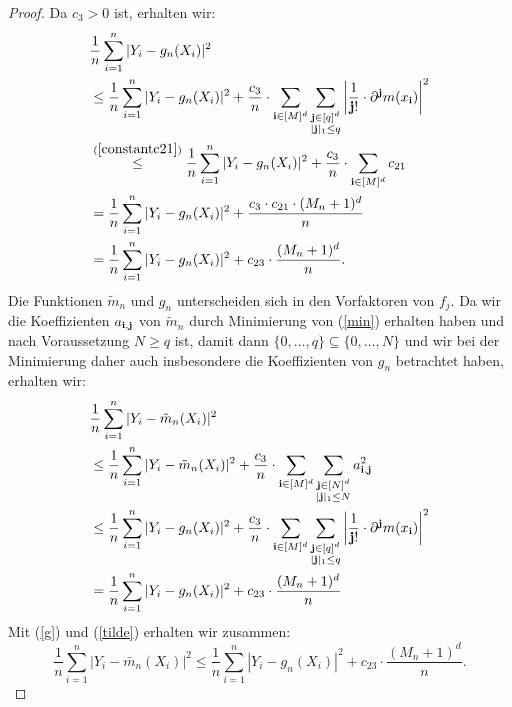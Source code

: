 \begin{proof}
Da $c_3 > 0$ ist, erhalten wir:
\begin{equation}
\begin{split}
\label{g}
& \frac{1}{n} \sum_{i = 1}^n|Y_i - g_n(X_i)|^2 \\
& \leq \frac{1}{n} \sum_{i = 1}^n|Y_i - g_n(X_i)|^2 + \frac{c_3}{n} \cdot \sum_{\mathbf{i} \in [M]^d} \sum_{\substack{\mathbf{j} \in [q]^d \\ |\mathbf{j}|_1 \leq q}} \bigg|\frac{1}{\mathbf{j}!} \cdot \partial^{\mathbf{j}}m(x_{\mathbf{i}})\bigg|^2 \\
& \stackrel{(\ref{constantc21})}{\leq} \frac{1}{n} \sum_{i = 1}^n|Y_i - g_n(X_i)|^2 +  \frac{c_3}{n} \cdot \sum_{\mathbf{i} \in [M]^d} c_{21} \\
& = \frac{1}{n} \sum_{i = 1}^n|Y_i - g_n(X_i)|^2 + \frac{c_3 \cdot c_{21} \cdot (M_n + 1)^d}{n} \\
& = \frac{1}{n} \sum_{i = 1}^n|Y_i - g_n(X_i)|^2 + c_{23} \cdot \frac{(M_n + 1)^d}{n}.
\end{split}
\end{equation}
Die Funktionen $\tilde{m}_n$ und $g_n$ unterscheiden sich in den Vorfaktoren von $f_j$. Da wir die Koeffizienten $a_{\mathbf{i},\mathbf{j}}$ von $\tilde{m}_n$ durch Minimierung von (\ref{min}) erhalten haben und nach Voraussetzung $N \geq q$ ist, damit dann $\{0,\dots,q\} \subseteq \{0,\dots,N\}$ und wir bei der Minimierung daher auch insbesondere die Koeffizienten von $g_n$ betrachtet haben, erhalten wir:
\begin{equation}
\begin{split}
\label{tilde}
& \frac{1}{n} \sum_{i = 1}^n|Y_i - \tilde{m}_n(X_i)|^2 \\
& \leq \frac{1}{n} \sum_{i = 1}^n|Y_i - \tilde{m}_n(X_i)|^2 + \frac{c_3}{n} \cdot \sum_{\mathbf{i} \in [M]^d} \sum_{\substack{ \mathbf{j} \in [N]^d \\ |\mathbf{j}|_1 \leq N}} a_{\mathbf{i},\mathbf{j}}^2 \\
& \leq \frac{1}{n} \sum_{i = 1}^n|Y_i - g_n(X_i)|^2 + \frac{c_3}{n} \cdot \sum_{\mathbf{i} \in [M]^d} \sum_{\substack{ \mathbf{j} \in [q]^d \\ |\mathbf{j}|_1 \leq q}} \bigg|\frac{1}{\mathbf{j}!} \cdot \partial^{\mathbf{j}}m(x_{\mathbf{i}})\bigg|^2 \\
& = \frac{1}{n} \sum_{i = 1}^n|Y_i - g_n(X_i)|^2 + c_{23} \cdot \frac{(M_n + 1)^d}{n}
\end{split}
\end{equation}
Mit (\ref{g}) und (\ref{tilde}) erhalten wir zusammen:
\begin{equation}
\label{bed}
\frac{1}{n} \sum_{i = 1}^n|Y_i - \bar{m}_n(X_i)|^2 \leq \frac{1}{n} \sum_{i = 1}^n|Y_i - g_n(X_i)|^2 + c_{23} \cdot \frac{(M_n + 1)^d}{n}.

\end{equation}
\end{proof}
